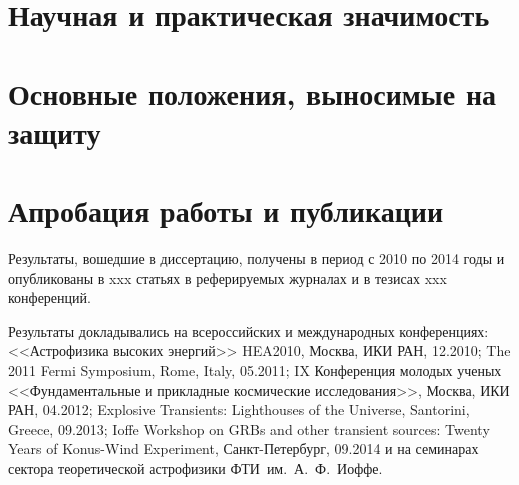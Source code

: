 \section{Научная и практическая значимость}



\section{Основные положения, выносимые на защиту}




\section{Апробация работы и публикации}
Результаты, вошедшие в диссертацию, получены в период с 2010 по 2014
годы и опубликованы в xxx статьях в реферируемых журналах и в тезисах xxx конференций. 

Результаты докладывались на всероссийских и международных конференциях: 
<<Астрофизика высоких энергий>> HEA2010, Москва, ИКИ РАН, 12.2010;
The 2011 Fermi Symposium, Rome, Italy, 05.2011;
IX Конференция молодых ученых <<Фундаментальные и прикладные космические исследования>>, Москва, ИКИ РАН, 04.2012;
Explosive Transients: Lighthouses of the Universe, Santorini, Greece, 09.2013;
Ioffe Workshop on GRBs and other transient sources: Twenty Years of Konus-Wind Experiment, Санкт-Петербург, 09.2014
и на семинарах сектора теоретической астрофизики ФТИ~им.~А.~Ф.~Иоффе.

\clearpage